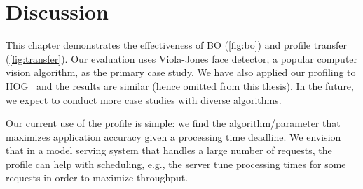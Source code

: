 \section{Discussion}
\label{sec:discussion}

 This chapter demonstrates the effectiveness of BO
(\autoref{fig:bo}) and profile transfer (\autoref{fig:transfer}). Our evaluation
uses Viola-Jones face detector, a popular computer vision algorithm, as the
primary case study. We have also applied our profiling to
HOG~\cite{dalal2005histograms} and the results are similar (hence omitted from
this thesis). In the future, we expect to conduct more case studies with diverse
algorithms.

 Our current use of the profile is simple: we find the
algorithm/parameter that maximizes application accuracy given a processing time
deadline. We envision that in a model serving system that handles a large number
of requests, the profile can help with scheduling, e.g., the server tune
processing times for some requests in order to maximize throughput.

